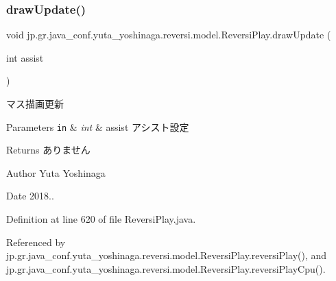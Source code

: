 \subsubsection{\texorpdfstring{draw\+Update()}{drawUpdate()}}
{\footnotesize\ttfamily void jp.\+gr.\+java\+\_\+conf.\+yuta\+\_\+yoshinaga.\+reversi.\+model.\+Reversi\+Play.\+draw\+Update (\begin{DoxyParamCaption}\item[{int}]{assist }\end{DoxyParamCaption})}



マス描画更新 


\begin{DoxyParams}[1]{Parameters}
\mbox{\tt in}  & {\em int} & assist アシスト設定 \\
\hline
\end{DoxyParams}
\begin{DoxyReturn}{Returns}
ありません 
\end{DoxyReturn}
\begin{DoxyAuthor}{Author}
Yuta Yoshinaga 
\end{DoxyAuthor}
\begin{DoxyDate}{Date}
2018.. 
\end{DoxyDate}


Definition at line 620 of file Reversi\+Play.\+java.



Referenced by jp.\+gr.\+java\+\_\+conf.\+yuta\+\_\+yoshinaga.\+reversi.\+model.\+Reversi\+Play.\+reversi\+Play(), and jp.\+gr.\+java\+\_\+conf.\+yuta\+\_\+yoshinaga.\+reversi.\+model.\+Reversi\+Play.\+reversi\+Play\+Cpu().

